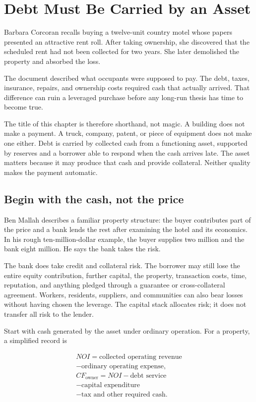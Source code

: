 \chapter{Debt Must Be Carried by an Asset}

Barbara Corcoran recalls buying a twelve-unit country motel whose papers
presented an attractive rent roll. After taking ownership, she discovered that
the scheduled rent had not been collected for two years. She later demolished
the property and absorbed the loss.

The document described what occupants were supposed to pay. The debt, taxes,
insurance, repairs, and ownership costs required cash that actually arrived.
That difference can ruin a leveraged purchase before any long-run thesis has
time to become true.

The title of this chapter is therefore shorthand, not magic. A building does
not make a payment. A truck, company, patent, or piece of equipment does not
make one either. Debt is carried by collected cash from a functioning asset,
supported by reserves and a borrower able to respond when the cash arrives
late. The asset matters because it may produce that cash and provide collateral.
Neither quality makes the payment automatic.

\section{Begin with the cash, not the price}

Ben Mallah describes a familiar property structure: the buyer contributes part
of the price and a bank lends the rest after examining the hotel and its
economics. In his rough ten-million-dollar example, the buyer supplies two
million and the bank eight million. He says the bank takes the risk.

The bank does take credit and collateral risk. The borrower may still lose the
entire equity contribution, further capital, the property, transaction costs,
time, reputation, and anything pledged through a guarantee or cross-collateral
agreement. Workers, residents, suppliers, and communities can also bear losses
without having chosen the leverage. The capital stack allocates risk; it does
not transfer all risk to the lender.

Start with cash generated by the asset under ordinary operation. For a property,
a simplified record is

\begin{equation}
\begin{gathered}
NOI=\text{collected operating revenue}\\
-\text{ordinary operating expense},\\[0.5ex]
CF_{\mathrm{owner}}=NOI-\text{debt service}\\
-\text{capital expenditure}\\
-\text{tax and other required cash}.
\end{gathered}
\end{equation}

